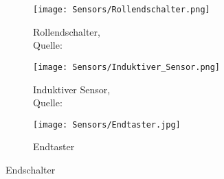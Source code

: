 \begin{figure}[H]
    \centering
    \begin{subfigure}{.3\textwidth}
        \centering
        \texttt{[image: Sensors/Rollendschalter.png]}
        \caption{Rollendschalter,\\ Quelle: \cite{schmersal_pic}}
        \label{roll_sens}
    \end{subfigure}%
    \begin{subfigure}{.3\textwidth}
        \centering
        \texttt{[image: Sensors/Induktiver\_Sensor.png]}
        \caption{Induktiver Sensor,\\ Quelle: \cite{induktiv_sensor}}
        \label{ind_sens}
    \end{subfigure}%
    \begin{subfigure}{.3\textwidth}
        \centering
        \texttt{[image: Sensors/Endtaster.jpg]}
        \caption{Endtaster}
        \label{tast_sens}
    \end{subfigure}
    \caption{Endschalter}
\end{figure}

